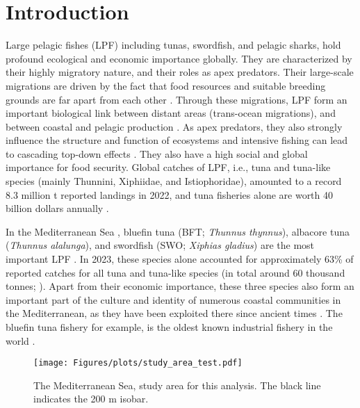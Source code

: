 \chapter{Introduction}
Large pelagic fishes (LPF) including tunas, swordfish, and pelagic sharks, hold profound ecological
and economic importance globally. They are characterized by their highly migratory nature, and
their roles as apex predators. Their large-scale migrations are driven by the fact that food
resources and suitable breeding grounds are far apart from each other
\citep{fromentin_2005_tunareview,swordfish_migration,migration_lpf}. Through these migrations, LPF
form an important biological link between distant areas (trans-ocean migrations), and between
coastal and pelagic production \citep{linking_study}. As apex predators, they also strongly
influence the structure and function of ecosystems and intensive fishing can lead to cascading
top-down effects \citep{baum_worm_cascading,young15}. They also have a high social and global
importance for food security. Global catches of LPF, i.e., tuna and tuna-like species (mainly
Thunnini, Xiphiidae, and Istiophoridae), amounted to a record 8.3 million t reported landings in
2022, and tuna fisheries alone are worth 40 billion dollars annually
\citep{FAO2024,pew_tuna_value}.

\medskip

In the Mediterranean Sea , bluefin tuna (BFT; \textit{Thunnus thynnus}),
albacore tuna (\textit{Thunnus alalunga}), and swordfish (SWO; \textit{Xiphias gladius}) are the
most important LPF \citep{fisheries_med_2000}. In 2023, these species alone accounted for
approximately 63\% of reported catches for all tuna and tuna-like species (in total around 60
thousand tonnes; \citealp{iccat_catches}). Apart from their economic importance, these three
species also form an important part of the culture and identity of numerous coastal communities in
the Mediterranean, as they have been exploited there since ancient times
\citep{cultural_social_addis,usai_22_culture,natale2005,andrews_ancient}. The bluefin tuna fishery
for example, is the oldest known industrial fishery in the world \citep{natale2012}.

\medskip

\begin{figure}[H]
	\texttt{[image: Figures/plots/study\_area\_test.pdf]}
	\caption{The Mediterranean Sea, study area for this analysis. The black line indicates the 200 m isobar.}
	\label{fig:study_area}
\end{figure}

